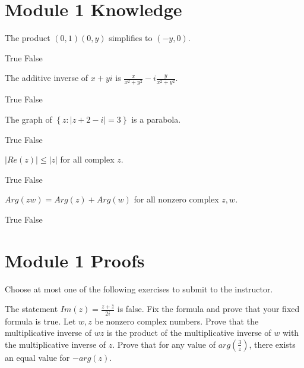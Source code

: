 \documentclass[12pt]{exam}
\newcommand{\setB}[2]{\left\{#1:#2\right\}}
\begin{document}
\section*{Module 1 Knowledge}

\begin{questions}

\setcounter{question}{5}

\question The product \((0,1)(0,y)\) simplifies to \((-y,0)\).
\begin{choices}
\choice True
\choice False
\end{choices}

\question The additive inverse of \(x+yi\) is \(\frac{x}{x^2+y^2}-i\frac{y}{x^2+y^2}\).
\begin{choices}
\choice True
\choice False
\end{choices}

\question The graph of \(\setB{z}{|z+2-i|=3}\) is a parabola.
\begin{choices}
\choice True
\choice False
\end{choices}

\question \(|Re(z)|\leq|z|\) for all complex \(z\). 
\begin{choices}
\choice True
\choice False
\end{choices}

\question \(Arg(zw)=Arg(z)+Arg(w)\) for all nonzero complex \(z,w\). 
\begin{choices}
\choice True
\choice False
\end{choices}
\end{questions}

\section*{Module 1 Proofs}

Choose at most one of the following exercises to submit to the instructor.

\begin{questions}

\setcounter{question}{10}

\question The statement \(Im(z)=\frac{z+\overline{z}}{2i}\) is false. Fix the formula
  and prove that your fixed formula is true. 
\question Let \(w,z\) be nonzero complex numbers. Prove that the multiplicative inverse of
  \(wz\) is the product of the multiplicative inverse of \(w\) with the multiplicative
  inverse of \(z\).
\question Prove that for any value of \(arg(\frac{3}{z})\), there exists an equal value
  for \(-arg(z)\).

\end{questions}
\end{document}

